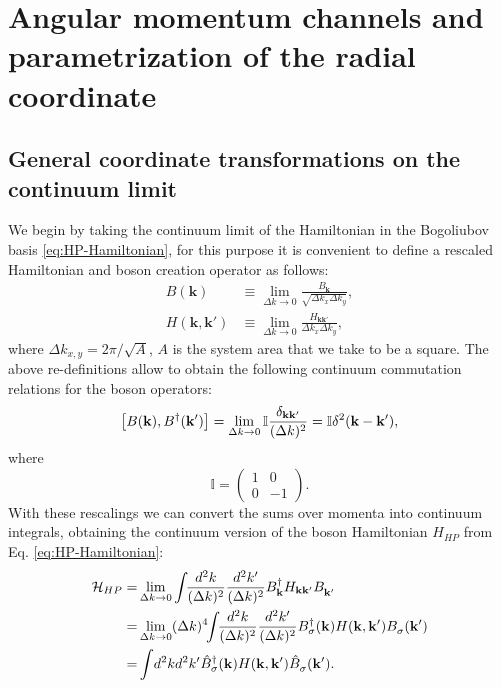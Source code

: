 \documentclass[english,aps,prd,nofootinbib,twocolumn]{revtex4-1}
\begin{document}
\section{Angular momentum channels and parametrization of the radial coordinate}

\subsection{General coordinate transformations on the continuum limit}
We begin by taking the continuum limit of the Hamiltonian in the Bogoliubov basis \eqref{eq:HP-Hamiltonian}, for this purpose it is convenient to define a rescaled Hamiltonian and boson creation operator as follows: 
\begin{equation}
\begin{split}
    B(\mathbf{k}) &\equiv \lim_{\Delta k\rightarrow 0} \frac{B_{\mathbf{k}}}{\sqrt{\Delta k_{x}\Delta k_{y}}},\\
    H(\mathbf{k },\mathbf{k'}) &\equiv \lim_{\Delta k \rightarrow 0}
    \frac{H_{\mathbf{kk'}}}{\Delta k_{x}\Delta k_{y}},
\end{split}
\end{equation}
where $\Delta k_{x,y}=2\pi/\sqrt{A}$, $A$ is the system area that we take to be a square. The above re-definitions allow to obtain the following continuum commutation relations for the boson operators:
\begin{equation*}
    \left[
B(\mathbf{k }),
B^{\textcolor{black}{\dagger}}(\mathbf{k'})
\right] = \lim_{\Delta k\rightarrow 0}  \mathbb{I}\frac{\delta_{\mathbf{k k'}}}{(\Delta k)^2}
    = \mathbb{I}\delta^{2}(\mathbf{k-k'}),
\end{equation*}
where 
\begin{equation}
\mathbb{I} = 
\begin{pmatrix}
1	&	0	\\	0	&	-1	
\end{pmatrix}.
\end{equation}
With these rescalings we can convert the sums over momenta into continuum integrals, obtaining the continuum version of the boson Hamiltonian $H_{HP}$ from Eq. \eqref{eq:HP-Hamiltonian}:
\begin{equation*}
\begin{split}
\mathcal{H}_{HP} =& \lim_{\Delta k\rightarrow 0} \int \!\!
\frac{d^{2}k }{(\Delta k)^2}
\frac{d^{2}k'}{(\Delta k)^2}
B_{\mathbf{k }}^{\textcolor{black}{\dagger}}
H_{\mathbf{k } \mathbf{k'}}
B_{\mathbf{k'}}^{\textcolor{white}{\dagger}}\\
 =& \lim_{\Delta k\rightarrow 0} (\Delta k)^4 \!\! \int \!\!
\frac{d^{2}k }{(\Delta k)^2}
\frac{d^{2}k'}{(\Delta k)^2}
B_{\sigma }^{\textcolor{black}{\dagger}}(\mathbf{k })
H(\mathbf{k },\mathbf{k'})
B_{\sigma 
}^{\textcolor{white}{\dagger}}(\mathbf{k'})
\\
 =& \int \! d^{2}k d^{2}k'
\hat{B}_{\sigma }^{\textcolor{black}{\dagger}}(\mathbf{k })
H(\mathbf{k },\mathbf{k'})
\hat{B}_{\sigma 
}^{\textcolor{white}{\dagger}}(\mathbf{k'})
.
\end{split}
\end{equation*}
\end{document}
